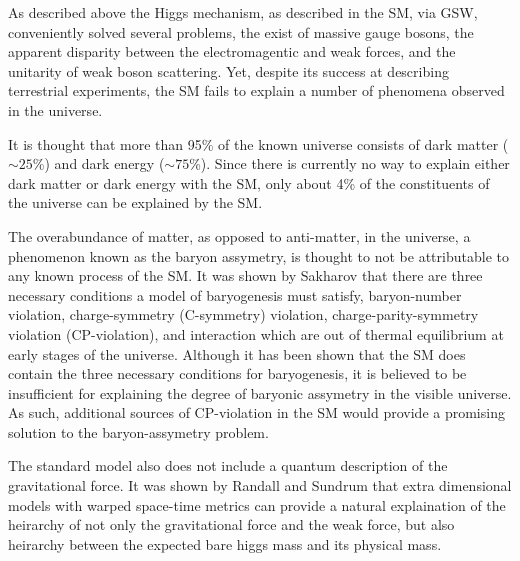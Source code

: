 
As described above the Higgs mechanism, as described in the SM, via GSW, 
conveniently solved several problems, the exist of massive gauge bosons,
the apparent disparity between the electromagentic and weak forces, and 
the unitarity of weak boson scattering. Yet, despite its success at 
describing terrestrial experiments, the SM fails 
to explain a number of phenomena observed in the universe.
  
It is thought that more than 95\% of the known universe consists of dark 
matter ($\sim25$\%) and dark energy ($\sim75$\%)\cite{??}.  Since there is 
currently no way to explain either dark matter or dark energy with the SM, 
only about 4\% of the constituents of the universe can be explained by the 
SM.  

The overabundance of matter, as opposed to anti-matter, in the 
universe, a phenomenon known as the baryon assymetry, is thought to not be 
attributable to any known process of the SM.
It was shown by Sakharov\cite{??} that there are three necessary conditions 
a model of baryogenesis must satisfy, baryon-number violation, 
charge-symmetry (C-symmetry) violation, charge-parity-symmetry violation 
(CP-violation), and interaction which are out of thermal equilibrium at early
stages of the universe.  Although it has been shown that the SM does
contain the three necessary conditions for baryogenesis, it is believed
to be insufficient for explaining the degree of baryonic assymetry in the 
visible universe.  As such, additional sources of CP-violation in the SM 
would provide a promising solution to the baryon-assymetry problem.  

The standard model also does not include a quantum description of the 
gravitational force.  It was shown by Randall and Sundrum that extra 
dimensional models with warped space-time metrics can provide a natural 
explaination of the heirarchy of not only the gravitational force and the 
weak force, but also heirarchy between the expected bare higgs mass and 
its physical mass. 


